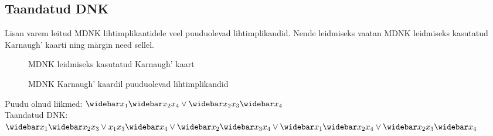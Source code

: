 \subsection{Taandatud DNK}
Lisan varem leitud MDNK lihtimplikantidele veel puuduolevad lihtimplikandid. Nende leidmiseks vaatan MDNK leidmiseks kasutatud Karnaugh' kaarti ning märgin need sellel.

\begin{figure}[H]
\centering
\begin{Karnaugh}
\end{Karnaugh}
\caption{MDNK leidmiseks kasutatud Karnaugh' kaart}
\label{fig:karnaugh-piirkond1}
\end{figure}

\begin{figure}[H]
\centering
\begin{Karnaugh}
\end{Karnaugh}
\caption{MDNK Karnaugh' kaardil puuduolevad lihtimplikandid}
\label{fig:karnaugh-piirkond1}
\end{figure}
Puudu olnud liikmed: $\wb{x_1}\wb{x_2}x_4 \lor \wb{x_2}x_3\wb{x_4}$\\
Taandatud DNK: $\wb{x_1}\wb{x_2}x_3 \lor x_1x_3\wb{x_4} \lor \wb{x_2}\wb{x_3}x_4 \lor \wb{x_1}\wb{x_2}x_4 \lor \wb{x_2}x_3\wb{x_4}$
